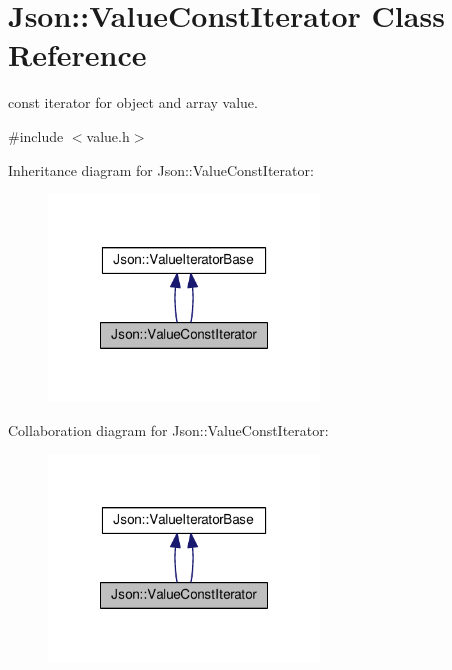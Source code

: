 \hypertarget{classJson_1_1ValueConstIterator}{\section{Json\-:\-:Value\-Const\-Iterator Class Reference}
\label{d8/d4f/classJson_1_1ValueConstIterator}
}


const iterator for object and array value.  




{\ttfamily \#include $<$value.\-h$>$}



Inheritance diagram for Json\-:\-:Value\-Const\-Iterator\-:
\nopagebreak
\begin{figure}[H]
\begin{center}
\leavevmode
\includegraphics[width=204pt]{d8/dea/classJson_1_1ValueConstIterator__inherit__graph}
\end{center}
\end{figure}


Collaboration diagram for Json\-:\-:Value\-Const\-Iterator\-:
\nopagebreak
\begin{figure}[H]
\begin{center}
\leavevmode
\includegraphics[width=204pt]{d9/d3e/classJson_1_1ValueConstIterator__coll__graph}
\end{center}
\end{figure}
